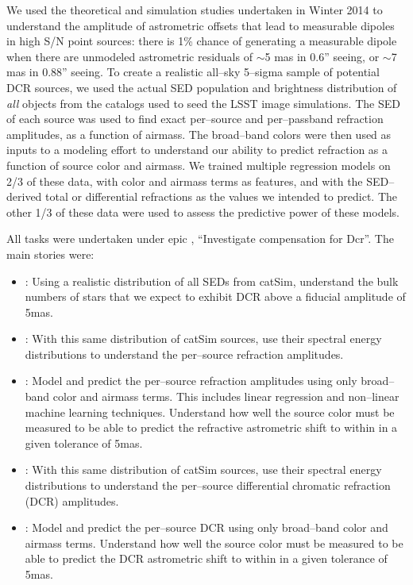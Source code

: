 \documentclass[DM,toc]{lsstdoc}
\begin{document}
We used the theoretical and simulation studies undertaken in Winter
2014 
to understand the amplitude of astrometric offsets that lead to
measurable dipoles in high S/N point sources: there is 1\% chance of
generating a measurable dipole when there are unmodeled astrometric
residuals of $\sim$5 mas in 0.6'' seeing, or $\sim$7 mas in 0.88''
seeing.  To create a realistic all--sky 5--sigma sample of potential
DCR sources, we used the actual SED population and brightness
distribution of {\it all} objects from the catalogs used to seed the
LSST image simulations.  The SED of each source was used to find exact
per--source and per--passband refraction amplitudes, as a function of
airmass.  The broad--band colors were then used as inputs to a
modeling effort to understand our ability to predict refraction as a
function of source color and airmass.  We trained multiple regression
models on 2/3 of these data, with color and airmass terms as features,
and with the SED--derived total or differential refractions as the
values we intended to predict.  The other 1/3 of these data were used
to assess the predictive power of these models.

All tasks were undertaken under epic , ``Investigate
compensation for Dcr''.  The main stories were:

\begin{itemize}

\item {}: Using a realistic distribution of all SEDs from
  catSim, understand the bulk numbers of stars that we expect to
  exhibit DCR above a fiducial amplitude of 5mas.

\item {}: With this same distribution of catSim sources, use
  their spectral energy distributions to understand the per--source
  refraction amplitudes.

\item {}: Model and predict the per--source refraction
  amplitudes using only broad--band color and airmass terms.  This
  includes linear regression and non--linear machine learning
  techniques.  Understand how well the source color must be measured
  to be able to predict the refractive astrometric shift to within in
  a given tolerance of 5mas.

\item {}: With this same distribution of catSim sources, use
  their spectral energy distributions to understand the per--source
  differential chromatic refraction (DCR) amplitudes.

\item {}: Model and predict the per--source DCR using only
  broad--band color and airmass terms.  Understand how well the source
  color must be measured to be able to predict the DCR astrometric
  shift to within in a given tolerance of 5mas.

\end{itemize}
\end{document}
